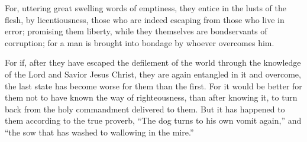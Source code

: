 {For, uttering great swelling words of emptiness, they entice in the lusts of the flesh, by licentiousness, those who are indeed escaping from those who live in error;
promising them liberty, while they themselves are bondservants of corruption; for a man is brought into bondage by whoever overcomes him.
\par }{\PP {}For if, after they have escaped the defilement of the world through the knowledge of the Lord and Savior Jesus Christ, they are again entangled in it and overcome, the last state has become worse for them than the first.
For it would be better for them not to have known the way of righteousness, than after knowing it, to turn back from the holy commandment delivered to them.
But it has happened to them according to the true proverb, “The dog turns to his own vomit again,” and “the sow that has washed to wallowing in the mire.”

}
